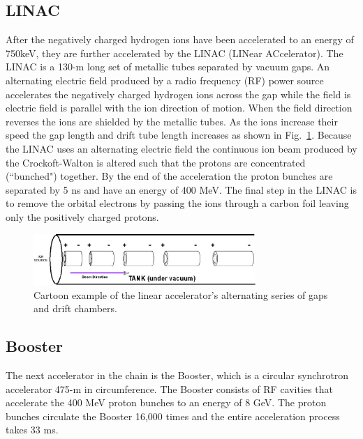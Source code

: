 \subsection{LINAC}
After the negatively charged hydrogen ions have been accelerated to an energy of 750keV, they are further accelerated by the LINAC (LINear ACcelerator). The LINAC is a 130-m long set of metallic tubes separated by vacuum gaps. An alternating electric field produced by a radio frequency (RF) power source accelerates the negatively charged hydrogen ions across the gap while the field is electric field is parallel with the ion direction of motion. When the field direction reverses the ions are shielded by the metallic tubes. As the ions increase their speed the gap length and drift tube length increases as shown in Fig.~\ref{LINAC}. Because the LINAC uses an alternating electric field the continuous ion beam produced by the Crockoft-Walton is altered such that the protons are concentrated (``bunched") together. By the end of the acceleration the proton bunches are separated by 5 ns and have an energy of 400 MeV. The final step in the LINAC is to remove the orbital electrons by passing the ions through a carbon foil leaving only the positively charged protons.

\begin{figure}[!h!tbp]
\begin{center}
\includegraphics[width=0.75\textwidth]{eps/Tevatron/LINAC.eps}
\end{center}
\vspace{-0.1in}
\caption{Cartoon example of the linear accelerator's alternating series of gaps and drift chambers.}
\label{LINAC}
\end{figure}

\subsection{Booster}
The next accelerator in the chain is the Booster, which is a circular synchrotron accelerator 475-m in circumference. The Booster consists of RF cavities that accelerate the 400 MeV proton bunches to an energy of 8 GeV. The proton bunches circulate the Booster 16,000 times and the entire acceleration process takes 33 ms.

